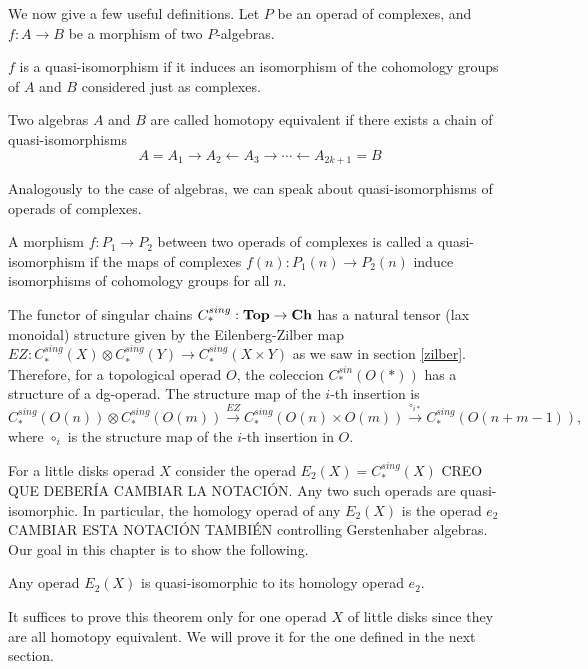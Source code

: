 \documentclass[TFM.tex]{subfiles}
\begin{document}
We now give a few useful definitions. Let $P$ be an operad of complexes, and $f : A→B$ be a morphism of two $P$-algebras.
\begin{defi}
$f$ is a quasi-isomorphism if it induces an isomorphism of the cohomology
groups of $A$ and $B$ considered just as complexes.
\end{defi}

\begin{defi}
Two algebras $A$ and $B$ are called homotopy equivalent if there exists a chain of quasi-isomorphisms
\[
A= A_1→A_2←A_3→\cdots←A_{2k+1} = B
\]
\end{defi}

Analogously to the case of algebras, we can speak about quasi-isomorphisms of operads
of complexes.

\begin{defi}
A morphism $f : P_1→P_2$ between two operads of complexes is called a
quasi-isomorphism if the maps of complexes $f(n) : P_1(n)→P_2(n)$ induce isomorphisms of
cohomology groups for all $n$.
\end{defi}


The functor of singular chains $C_*^{sing}:\mathrm{\mathbf{Top}}\to \mathrm{\mathbf{Ch}}$ has a natural tensor (lax monoidal) structure given by the Eilenberg-Zilber map $EZ:C_*^{sing}(X)\otimes C_*^{sing}(Y)\to C_*^{sing}(X\times Y)$ as we saw in section \ref{zilber}. Therefore, for a topological operad $O$, the coleccion $C_*^{sin}(O(*))$ has a structure of a dg-operad. The structure map of the $i$-th insertion is 
\[
C_*^{sing}(O(n))\otimes C_*^{sing}(O(m))\xrightarrow{EZ} C_*^{sing}(O(n)\times O(m))\xrightarrow{\circ_{i*}} C_*^{sing}(O(n+m-1)),
\]
where $\circ_i$ is the structure map of the $i$-th insertion in $O$. 

For a little disks operad $X$ consider the operad $E_2(X)=C_*^{sing}(X)$ CREO QUE DEBERÍA CAMBIAR LA NOTACIÓN. Any two such operads are quasi-isomorphic. In particular, the homology operad of any $E_2(X)$ is the operad $e_2$ CAMBIAR ESTA NOTACIÓN TAMBIÉN controlling Gerstenhaber algebras. Our goal in this chapter is to show the following.

\begin{thm}
Any operad $E_2(X)$ is quasi-isomorphic to its homology operad $e_2$.
\end{thm}

It suffices to prove this theorem only for one operad $X$ of little disks since they are all homotopy equivalent. We will prove it for the one defined in the next section.
\end{document}
